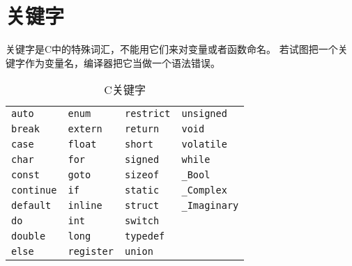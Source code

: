 \section{关键字}
\begin{frame}[fragile]\ft{\secname}
关键字是C中的特殊词汇，不能用它们来对变量或者函数命名。
若试图把一个关键字作为变量名，编译器把它当做一个语法错误。
\end{frame}

\lstset{language=[ansi]c}
\begin{frame}[fragile]\ft{\secname}
\begin{table}
\centering
\caption{C关键字}
\begin{tabular}{p{2cm}p{2cm}p{2cm}p{2cm}}\hline
\lstinline|auto| & \lstinline|enum| & \lstinline|restrict| & \lstinline|unsigned| \\
\lstinline|break| & \lstinline|extern| & \lstinline|return| & \lstinline|void| \\
\lstinline|case| & \lstinline|float| & \lstinline|short| &\lstinline|volatile| \\
\lstinline|char| & \lstinline|for| & \lstinline|signed| & \lstinline|while| \\
\lstinline|const| & \lstinline|goto| & \lstinline|sizeof| & \lstinline|_Bool| \\
\lstinline|continue| & \lstinline|if| & \lstinline|static| & \lstinline|_Complex| \\
\lstinline|default| & \lstinline|inline| & \lstinline|struct| & \lstinline|_Imaginary|\\
\lstinline|do| & \lstinline|int| & \lstinline|switch| &  \\
\lstinline|double| & \lstinline|long| & \lstinline|typedef| & \\
\lstinline|else| & \lstinline|register| & \lstinline|union| \\ \hline
\end{tabular}
\end{table}
\end{frame}


